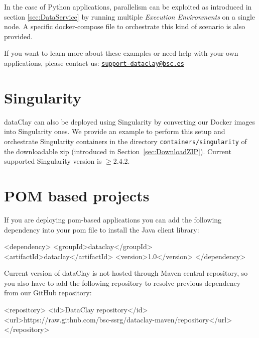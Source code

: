 In the case of Python applications, parallelism can be exploited as introduced in section \ref{sec:DataService} by running multiple \textit{Execution Environments} on a single node. A specific docker-compose file to orchestrate this kind of scenario is also provided.

If you want to learn more about these examples or need help with your own applications, please contact us: \texttt{\href{mailto:support-dataclay@bsc.es}{support-dataclay@bsc.es}}

\section{Singularity}

dataClay can also be deployed using Singularity by converting our Docker images into Singularity ones. We provide an example to perform this setup and orchestrate Singularity containers in the directory \texttt{containers/singularity} of the downloadable zip (introduced in Section~\ref{sec:DownloadZIP}). Current supported Singularity version is $\geq$2.4.2.

\section{POM based projects}
\label{sec:POMbasedProjects}

If you are deploying pom-based applications you can add the following dependency into your pom file to install the Java client library:

\begin{tBox}
\footnotesize
 \begin{bash}
  <dependency>
    <groupId>dataclay</groupId>
    <artifactId>dataclay</artifactId>
    <version>1.0</version>
  </dependency>
 \end{bash}
\end{tBox}

Current version of dataClay is not hosted through Maven central repository, so you also have to add the following repository to resolve previous dependency from our GitHub repository:

\begin{tBox}
\footnotesize
 \begin{bash}
  <repository>
    <id>DataClay repository</id>
    <url>https://raw.github.com/bsc-ssrg/dataclay-maven/repository</url>
  </repository>
 \end{bash}
\end{tBox}
